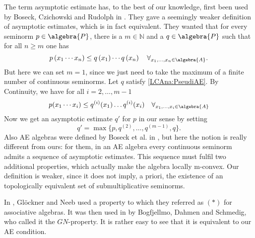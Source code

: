 \begin{remark}
	\label{LCAna:Rem:AE1}
	\mbox{}
	\begin{remarklist}
		\item
		The term asymptotic estimate has, to the best of our knowledge, 
		first been used by Boseck, Czichowski and Rudolph in 
		\cite{boseck.czichowski.rudolph:1981a}. They gave a seemingly weaker
		definition of asymptotic estimates, which is in fact equivalent.
		They wanted that for every seminorm $p\in \algebra{P}$, there is a 
		$m \in \mathbb{N}$ and a $q \in \algebra{P}$ such that for all 
		$n \geq m$ one has
		\begin{equation}
			\label{LCAna:PseudiAE}
			p \left( x_1 \cdots x_n \right)
			\leq
			q \left(x_1\right) \cdots q \left(x_n\right)
			\quad
			\forall_{x_1, \ldots, x_n \in \algebra{A}}.
		\end{equation}
		But here we can set $m = 1$, since we just need to take the maximum of 
		a finite number of continuous seminorms. Let $q$ satisfy 
		\eqref{LCAna:PseudiAE}. By Continuity, we have for all 
		$i = 2, \ldots, m-1$
		\begin{equation*}
		 	p(x_1 \cdots x_i)
		 	\leq
		 	q^{(i)}(x_1) \ldots q^{(i)}(x_i)
		 	\quad
		 	\forall_{x_1, \ldots, x_i \in \algebra{A}}
		\end{equation*}
		Now we get an asymptotic estimate $q'$ for $p$ in our sense by setting
		\begin{equation*}
		 	q'
		 	=
		 	\max\{ 
		 		p, q^{(2)}, \ldots, q^{(m-1)}, q
		 	\}.
		\end{equation*}
		Also AE algebras were defined by Boseck et al. in 
		\cite{boseck.czichowski.rudolph:1981a}, but here the notion is really 
		different from ours: for them, in an AE algebra every continuous 
		seminorm admits a sequence of asymptotic estimates. This sequence must 
		fulfil two additional properties, which actually make the algebra 
		locally 	m-convex. Our definition is weaker,	since it does not imply, 
		a priori, the existence of an topologically equivalent set of 
		submultiplicative seminorms.
		
		\item
		In \cite{gloeckner.neeb:2012a}, Gl\"ockner and Neeb used a property to 
		which they referred as $(*)$ for associative algebras. It was then 
		used in 	\cite{bogfjellmo.dahmen.schmedig:2015a} by Bogfjellmo, Dahmen 
		and Schmedig, who called it the $GN$-property. It is rather easy to 
		see that it is equivalent to our AE condition. 
	\end{remarklist}
\end{remark}

